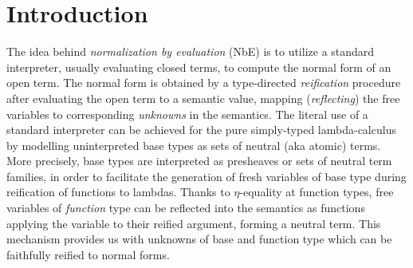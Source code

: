 \documentclass[sigplan,screen,fleqn]{acmart}
\begin{document}



\maketitle

\setlength{\mathindent}{\parindent}


\section{Introduction}
\label{sec:intro}

The idea behind \emph{normalization by evaluation} (NbE) is to utilize a
standard interpreter, usually evaluating closed terms, to compute the
normal form of an open term.
The normal form is obtained by a type-directed \emph{reification}
procedure after evaluating the open term to a semantic value, mapping
(\emph{reflecting})
the free variables to corresponding \emph{unknowns} in the semantics.
The literal use of a standard interpreter
can be achieved for the pure simply-typed lambda-calculus
\cite{bergerSchwichtenberg:lics91,filinski:semaccounttdpe}
by modelling uninterpreted base types as sets of neutral (aka atomic)
terms.   More precisely, base types are interpreted
as presheaves or sets of neutral term
families, in order to facilitate the generation of
fresh variables of base type during
reification of functions to lambdas.
Thanks to $\eta$-equality at function types, free variables of
\emph{function} type can be reflected into the semantics as functions
applying the variable to their reified argument,
forming a neutral term.  This mechanism provides us with unknowns of
base and function type which can be faithfully reified to normal forms.
\end{document}
